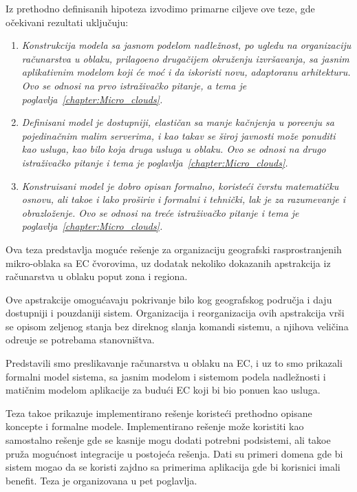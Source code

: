 Iz prethodno definisanih hipoteza izvodimo primarne ciljeve ove teze, gde o\v cekivani rezultati uklju\v cuju:

\begin{enumerate}[start=1,label={(\bfseries \arabic*)}]
	\item \textit{Konstrukcija modela sa jasnom podelom nadle\v znost, po ugledu na organizaciju ra\v cunarstva u oblaku, prilago\dj eno druga\v cijem okru\v zenju izvr\v savanja, sa jasnim aplikativnim modelom koji \'ce mo\'c i da iskoristi novu, adaptoranu arhitekturu. Ovo se odnosi na prvo istra\v ziva\v cko pitanje, a tema je poglavlja~\ref{chapter:Micro_clouds}.}
	\item \textit{Definisani model je dostupniji, elasti\v can sa manje ka\v cnjenja u pore\dj enju sa pojedina\v cnim malim serverima, i kao takav se \v siroj javnosti mo\v ze ponuditi kao usluga, kao bilo koja druga usluga u oblaku. Ovo se odnosi na drugo istra\v ziva\v cko pitanje i tema je poglavlja~\ref{chapter:Micro_clouds}.}
	\item \textit{Konstruisani model je dobro opisan formalno, koriste\'ci \v cvrstu matemati\v cku osnovu, ali tako\dj e i lako pro\v siriv i formalni i tehni\v cki, lak je za razumevanje i obrazlo\v zenje. Ovo se odnosi na tre\'ce istra\v ziva\v cko pitanje i tema je poglavlja~\ref{chapter:Micro_clouds}.}
\end{enumerate}

\noindent
Ova teza predstavlja mogu\'ce re\v senje za organizaciju geografski rasprostranjenih mikro-oblaka sa EC čvorovima, uz dodatak nekoliko dokazanih apstrakcija iz ra\v cunarstva u oblaku poput zona i regiona.

Ove apstrakcije omogu\'cavaju pokrivanje bilo kog geografskog područja i daju dostupniji i pouzdaniji sistem. Organizacija i reorganizacija ovih apstrakcija vr\v si se opisom zeljenog stanja bez direknog slanja komandi sistemu, a njihova veli\v cina odre\dj uje se potrebama stanovni\v stva.

Predstavili smo preslikavanje ra\v cunarstva u oblaku na EC, i uz to smo prikazali formalni model sistema, sa jasnim modelom i sistemom podela nadle\v znosti i mati\v cnim modelom aplikacije za budu\'ci EC koji bi bio ponu\dj en kao usluga. 

Teza tako\dj e prikazuje implementirano re\v senje koriste\'ci prethodno opisane koncepte i formalne modele. Implementirano re\v senje mo\v ze koristiti kao samostalno re\v senje gde se kasnije mogu dodati potrebni podsistemi, ali tako\dj e pru\v za mogu\'cnost integracije u postoje\'ca re\v senja. Dati su primeri domena gde bi sistem mogao da se koristi zajdno sa primerima aplikacija gde bi korisnici imali benefit. Teza je organizovana u pet poglavlja.

